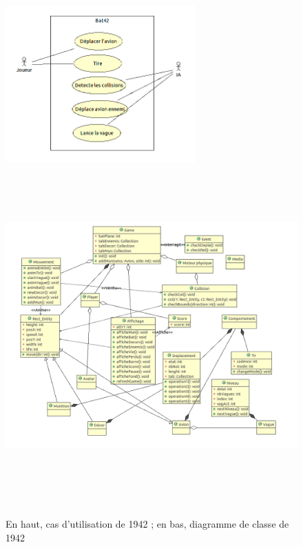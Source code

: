 \begin{figure}[h]
 \centering
 \includegraphics[height=6cm]{../umls/UML_images/Bat42/utilisation} \hfill
 \includegraphics[height=13cm]{../umls/UML_images/Bat42/class} \hfill
 \caption{En haut, cas d'utilisation de 1942 ; en bas, diagramme de classe de 1942}
\end{figure}

